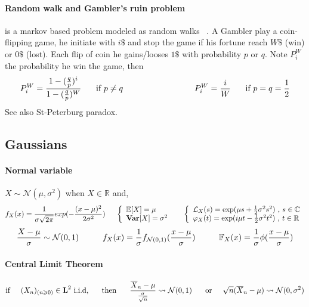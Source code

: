 \documentclass[a4paper,10pt]{article}
\begin{document}
\paragraph{Random walk and Gambler's ruin problem} is a markov based problem modeled as random walks ~\cite{KARL}. A Gambler play a coin-flipping game, he initiate with $i\$$ and stop the game if his fortune reach $W\$$ (win) or $0\$$ (lost). Each flip of coin he gains/looses $1\$$ with probability $p \text{ or } q$. Note $P_i^{W}$ the probability he win the game, then
\[
P_i^{W} = \frac{1- (\frac{q}{p})^i }{1- (\frac{q}{p})^W } \hspace{0.5cm} \text{  if } p\neq q
\hspace{3cm}
P_i^{W} = \frac{i}{W} \hspace{0.5cm}\text{  if } p = q = \frac{1}{2}
\]
See also St-Peterburg paradox.
\subsection{Gaussians}
\paragraph{Normal variable} $X \sim \mathcal{N}(\mu,\sigma^2)$ when $X \in \mathbb{R}$ and,
\[
f_{X}(x) = \frac{1}{\sigma \sqrt{2\pi}} exp (-\frac{(x-\mu)^2}{2\sigma^2})
\hspace{5mm}
\left\{
\begin{array}{l}
\mathbb{E}[X]=\mu \\
\textbf{Var}[X]=\sigma^2
\end{array}\right.
\hspace{5mm}
\left\{
\begin{array}{l}
\mathcal{L}_{X}(s) =  \text{exp}(\mu s  + \frac{1}{2} \sigma^2 s^2) \hbox{ , } s\in\mathbb{C} \\
\varphi_{X}(t)     =  \text{exp}(i\mu t - \frac{1}{2} \sigma^2 t^2) \hbox{ , } t\in\mathbb{R}
\end{array}\right.
\]
\[
\frac{X - \mu}{\sigma} \sim \mathcal{N}(0,1)
\hspace{10mm}
f_{X}(x) = \frac{1}{\sigma}f_{\mathcal{N}(0,1)}(\frac{x-\mu}{\sigma})
\hspace{10mm}
\mathbb{F}_{X}(x) = \frac{1}{\sigma}\phi(\frac{x-\mu}{\sigma})
\]
\paragraph{Central Limit Theorem}
\[
\text{if} \hspace{5mm} (X_{n})_{(n\geqslant 0)} \in \textbf{L}^2 \text{  i.i.d,} \hspace{5mm} \text{ then  } \hspace{5mm}
\frac{\overline{X}_n - \mu}{\frac{\sigma}{\sqrt{n}}} \rightsquigarrow   \mathcal{N}(0,1)
 \hspace{5mm}  \text{    or} \hspace{5mm}  
\sqrt{n}(\overline{X}_n - \mu) \rightsquigarrow   \mathcal{N}(0,\sigma^{2})
\]
\end{document}
